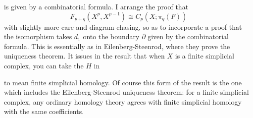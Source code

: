 \documentclass[../main]{subfiles}
\begin{document}
\begin{enumerate}[label=(\roman*)]
    \begin{center}
    \end{center}
    is given by a combinatorial formula. I arrange the proof that
    \begin{equation*}
        F_{p+q}(X^p,X^{p-1})\cong C_p(X;\pi_q(F))
    \end{equation*}
    with slightly more care and diagram-chasing, so as to incorporate a proof that the isomorphism takes $d_1$ onto the boundary $\partial$ given by the combinatorial formula. This is essentially as in Eilenberg-Steenrod, where they prove the uniqueness theorem. It issues in the result that when $X$ is a finite simplicial complex, you can take the $H$ in 
    \begin{center}
    \end{center}
    to mean finite simplicial homology. Of course this form of the result is the one which includes the Eilenberg-Steenrod uniqueness theorem: for a finite simplicial complex, any ordinary homology theory agrees with finite simplicial homology with the same coefficients.
\end{enumerate}
\end{document}
